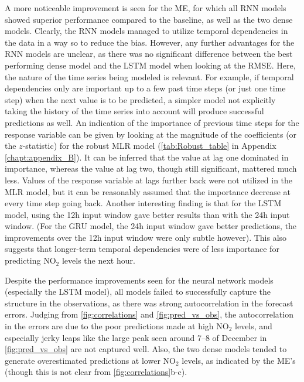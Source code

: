 A more noticeable improvement is seen for the ME, for which all RNN models showed superior performance compared to the baseline, as well as the two dense models. Clearly, the RNN models managed to utilize temporal dependencies in the data in a way so to reduce the bias. However, any further advantages for the RNN models are unclear, as there was no significant difference between the best performing dense model and the LSTM model when looking at the RMSE. Here, the nature of the time series being modeled is relevant. For example, if temporal dependencies only are important up to a few past time steps (or just one time step) when the next value is to be predicted, a simpler model not explicitly taking the history of the time series into account will produce successful predictions as well. An indication of the importance of previous time steps for the response variable can be given by looking at the magnitude of the coefficients (or the $z$-statistic) for the robust MLR model (\cref{tab:Robust_table} in Appendix \ref{chapt:appendix_B}). It can be inferred that the value at lag one dominated in importance, whereas the value at lag two, though still significant, mattered much less. Values of the response variable at lags further back were not utilized in the  MLR model, but it can be reasonably assumed that the importance decrease at every time step going back. Another interesting finding is that for the LSTM model, using the 12h input window gave better results than with the 24h input window. (For the GRU model, the 24h input window gave better predictions, the improvements over the 12h input window were only subtle however). This also suggests that longer-term temporal dependencies were of less importance for predicting NO$_2$ levels the next hour. 

Despite the performance improvements seen for the neural network models (especially the LSTM model), all models failed to successfully capture the structure in the observations, as there was strong autocorrelation in the forecast errors. Judging from \cref{fig:correlations} and \cref{fig:pred_vs_obs}, the autocorrelation in the errors are due to the poor predictions made at high NO$_2$ levels, and especially jerky leaps like the large peak seen around 7--8 of December in \cref{fig:pred_vs_obs} are not captured well. Also, the two dense models tended to generate overestimated predictions at lower NO$_2$ levels, as indicated by the ME's (though this is not clear from \cref{fig:correlations}b-c).

